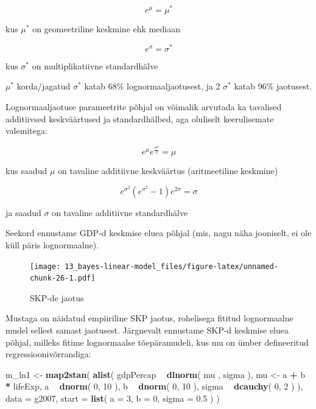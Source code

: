 \documentclass[]{book}
\newenvironment{Shaded}{\begin{snugshade}}{\end{snugshade}}
\newcommand{\KeywordTok}[1]{\textcolor[rgb]{0.13,0.29,0.53}{\textbf{#1}}}
\newcommand{\DataTypeTok}[1]{\textcolor[rgb]{0.13,0.29,0.53}{#1}}
\newcommand{\DecValTok}[1]{\textcolor[rgb]{0.00,0.00,0.81}{#1}}
\newcommand{\FloatTok}[1]{\textcolor[rgb]{0.00,0.00,0.81}{#1}}
\newcommand{\StringTok}[1]{\textcolor[rgb]{0.31,0.60,0.02}{#1}}
\newcommand{\OperatorTok}[1]{\textcolor[rgb]{0.81,0.36,0.00}{\textbf{#1}}}
\newcommand{\NormalTok}[1]{#1}
\begin{document}
\[e^\mu = \mu^*\]

kus \(\mu^*\) on geomeetriline keskmine ehk mediaan

\[e^\sigma = \sigma^*\]

kus \(\sigma^*\) on multiplikatiivne standardhälve

\(\mu^*\) korda/jagatud \(\sigma^*\) katab 68\% lognormaaljaotusest, ja
2 \(\sigma^*\) katab 96\% jaotusest.

Lognormaaljaotuse parameetrite põhjal on võimalik arvutada ka tavalised
additiivsed keskväärtused ja standardhälbed, aga oluliselt keerulisemate
valemitega:

\[e^\mu e^{\frac{\sigma^2}2} = \mu\]

kus saadud \(\mu\) on tavaline additiivne keskväärtus (aritmeetiline
keskmine)

\[e^{\sigma^2}(e^{\sigma^2} - 1)e^{2\sigma} =\sigma\]

ja saadud \(\sigma\) on tavaline additiivne standardhälve

Seekord ennustame GDP-d keskmise eluea põhjal (mis, nagu näha jooniselt,
ei ole küll päris lognormaalne).

\begin{figure}
\centering
\texttt{[image: 13\_bayes-linear-model\_files/figure-latex/unnamed-chunk-26-1.pdf]}
\caption{\label{fig:unnamed-chunk-26}SKP-de jaotus}
\end{figure}

Mustaga on näidatud empiiriline SKP jaotus, rohelisega fititud
lognormaalne mudel sellest samast jaotusest. Järgnevalt ennustame SKP-d
keskmise eluea põhjal, milleks fitime lognormaalse tõepäramudeli, kus mu
on ümber defineeritud regressioonivõrrandiga:

\begin{Shaded}
\begin{Highlighting}[]
\NormalTok{m_ln1 <-}\StringTok{ }\KeywordTok{map2stan}\NormalTok{(}
  \KeywordTok{alist}\NormalTok{(}
\NormalTok{   gdpPercap  }\OperatorTok{~}\StringTok{ }\KeywordTok{dlnorm}\NormalTok{( mu , sigma ),}
\NormalTok{    mu <-}\StringTok{ }\NormalTok{a }\OperatorTok{+}\StringTok{ }\NormalTok{b }\OperatorTok{*}\StringTok{ }\NormalTok{lifeExp,}
\NormalTok{    a }\OperatorTok{~}\StringTok{ }\KeywordTok{dnorm}\NormalTok{( }\DecValTok{0}\NormalTok{, }\DecValTok{10}\NormalTok{ ),}
\NormalTok{    b }\OperatorTok{~}\StringTok{ }\KeywordTok{dnorm}\NormalTok{( }\DecValTok{0}\NormalTok{, }\DecValTok{10}\NormalTok{ ),}
\NormalTok{    sigma }\OperatorTok{~}\StringTok{ }\KeywordTok{dcauchy}\NormalTok{( }\DecValTok{0}\NormalTok{, }\DecValTok{2}\NormalTok{ ) }
\NormalTok{   ), }
  \DataTypeTok{data =}\NormalTok{ g2007, }
  \DataTypeTok{start =} \KeywordTok{list}\NormalTok{( }\DataTypeTok{a =} \DecValTok{3}\NormalTok{, }\DataTypeTok{b =} \DecValTok{0}\NormalTok{, }\DataTypeTok{sigma =} \FloatTok{0.5}\NormalTok{ ) }
\NormalTok{  )}
\end{Highlighting}
\end{Shaded}
\end{document}
